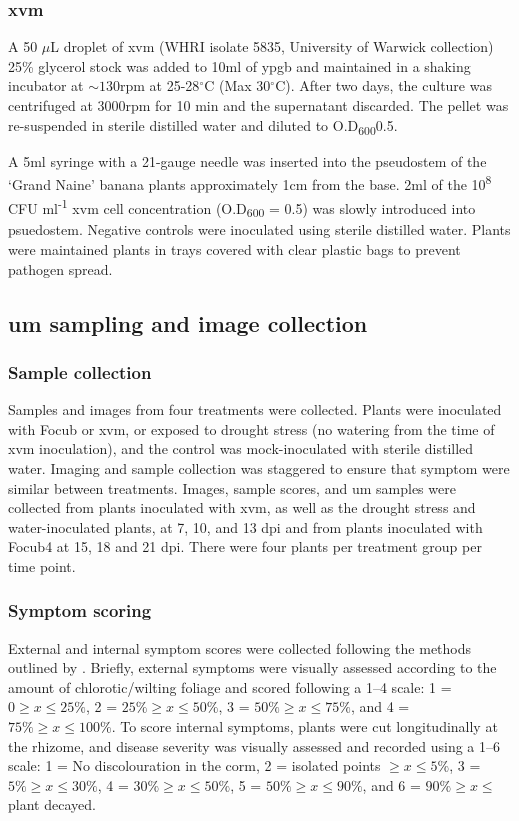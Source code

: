 \subsubsection{\acl{xvm}}
A 50 \(\mu\)L droplet of \acf{xvm} (WHRI isolate 5835, University of Warwick collection) 25\% glycerol stock was added to 10ml of \ac{ypgb} and maintained in a shaking incubator at $\sim130$rpm at 25-28$^{\circ}$C (Max 30$^{\circ}$C). After two days, the culture was centrifuged at 3000rpm for 10 min and the supernatant discarded. The pellet was re-suspended in sterile distilled water and diluted to O.D\textsubscript{600}0.5. 

A 5ml syringe with a 21-gauge needle was inserted into the pseudostem of the ‘Grand Naine’ banana plants approximately 1cm from the base. 2ml of the 10\textsuperscript{8} CFU ml\textsuperscript{-1} \ac{xvm} cell concentration (O.D\textsubscript{600} = 0.5) was slowly introduced into psuedostem. Negative controls were inoculated using sterile distilled water. Plants were maintained plants in trays covered with clear plastic bags to prevent pathogen spread. 

\subsection{\Acl{um} sampling and image collection}
\subsubsection{Sample collection}
Samples and images from four treatments were collected. Plants were inoculated with \ac{Focub} or \ac{xvm}, or exposed to drought stress (no watering from the time of \ac{xvm} inoculation), and the control was mock-inoculated with sterile distilled water. Imaging and sample collection was staggered to ensure that symptom were similar between treatments. Images, sample scores, and \ac{um} samples were collected from plants inoculated with \ac{xvm}, as well as the drought stress and water-inoculated plants, at 7, 10, and 13 \ac{dpi} and from plants inoculated with \ac{Focub4} at 15, 18 and 21 \ac{dpi}. There were four plants per treatment group per time point.  

\subsubsection{Symptom scoring}
External and internal symptom scores were collected following the methods outlined by \textcite{Garcia-Bastidas2019}. Briefly, external symptoms were visually assessed according to the amount of chlorotic/wilting foliage and scored following a 1–4 scale: 1 = $0\ge x \leq25\%$, 2 = $25\%\ge x \leq50\%$, 3 = $50\%\ge x \leq75\%$, and 4 = $75\%\ge x \leq100\%$. To score internal symptoms, plants were cut longitudinally at the rhizome, and disease severity was visually assessed and recorded using a 1–6 scale: 1 = No discolouration in the corm, 2 = isolated points $\ge x \leq5\%$, 3 = $5\%\ge x \leq30\%$, 4 = $30\%\ge x \leq50\%$, 5 = $50\%\ge x \leq90\%$, and 6 = $90\%\ge x \leq$ plant decayed. 

